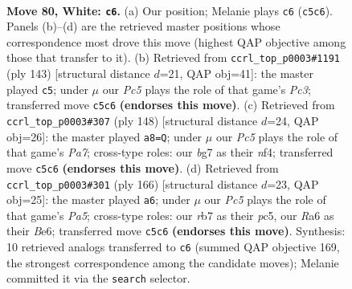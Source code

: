 \documentclass[11pt]{article}
\begin{document}
\clearpage

\begin{figure}[p]\centering
\begin{subfigure}{0.46\textwidth}\centering
\resizebox{\linewidth}{!}{%
\newchessgame
\chessboard[
  setfen={6k1/1r4b1/R7/2P3R1/8/8/2N3K1/8 w - - 1 80},
  showmover=false,
  pgfstyle=straightmove, color=movearrow, markmove={c5-c6}
]}
\caption{}
\end{subfigure}\hfill
\begin{subfigure}{0.46\textwidth}\centering
\resizebox{\linewidth}{!}{%
\newchessgame
\chessboard[
  setfen={8/8/2p4k/8/2r1BR1K/8/8/8 b - - 3 72},
  showmover=false,
  pgfstyle=straightmove, color=movearrow, markmove={c6-c5}
]}
\caption{}
\end{subfigure}
\\[4pt]
\begin{subfigure}{0.46\textwidth}\centering
\resizebox{\linewidth}{!}{%
\newchessgame
\chessboard[
  setfen={7r/PK6/8/8/1R3nk1/R7/8/8 w - - 11 75},
  showmover=false,
  pgfstyle=straightmove, color=movearrow, markmove={a7-a8}
]}
\caption{}
\end{subfigure}\hfill
\begin{subfigure}{0.46\textwidth}\centering
\resizebox{\linewidth}{!}{%
\newchessgame
\chessboard[
  setfen={R3bk2/8/4BB2/P1p5/8/6K1/8/8 w - - 5 84},
  showmover=false,
  pgfstyle=straightmove, color=movearrow, markmove={a5-a6}
]}
\caption{}
\end{subfigure}
\caption{\textbf{Move 80, White: \texttt{c6}.} (a) Our position; Melanie plays \texttt{c6} (\texttt{c5c6}). Panels (b)--(d) are the retrieved master positions whose correspondence most drove this move (highest QAP objective among those that transfer to it). (b) Retrieved from \texttt{ccrl\_top\_p0003\#1191} (ply 143) [structural distance $d$=21, QAP obj=41]: the master played \texttt{c5}; under $\mu$ our \emph{Pc5} plays the role of that game's \emph{Pc3}; transferred move \texttt{c5c6} \textbf{(endorses this move)}. (c) Retrieved from \texttt{ccrl\_top\_p0003\#307} (ply 148) [structural distance $d$=24, QAP obj=26]: the master played \texttt{a8=Q}; under $\mu$ our \emph{Pc5} plays the role of that game's \emph{Pa7}; cross-type roles: our \emph{b}g7 as their \emph{n}f4; transferred move \texttt{c5c6} \textbf{(endorses this move)}. (d) Retrieved from \texttt{ccrl\_top\_p0003\#301} (ply 166) [structural distance $d$=23, QAP obj=25]: the master played \texttt{a6}; under $\mu$ our \emph{Pc5} plays the role of that game's \emph{Pa5}; cross-type roles: our \emph{r}b7 as their \emph{p}c5, our \emph{R}a6 as their \emph{B}e6; transferred move \texttt{c5c6} \textbf{(endorses this move)}. Synthesis: 10 retrieved analogs transferred to \texttt{c6} (summed QAP objective 169, the strongest correspondence among the candidate moves); Melanie committed it via the \texttt{search} selector.}
\label{fig:thought-m158}
\end{figure}
\end{document}
